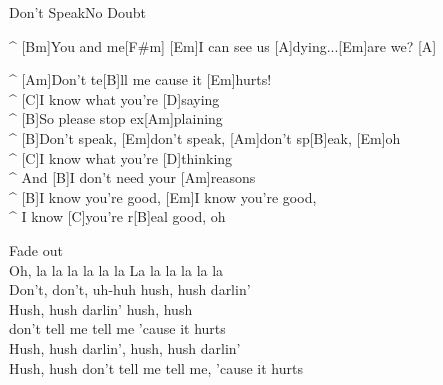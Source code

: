 \begin{song}{Don't Speak}{No Doubt}
\begin{guitar}
^ [Bm]You and me[F#m]      [Em]I can see us [A]dying...[Em]are we? [A]\\
\end{guitar}


\begin{guitar}
^ [Am]Don't te[B]ll me cause it [Em]hurts! \\
^ [C]I know what you're [D]saying\\
^ [B]So please stop ex[Am]plaining\\
^ [B]Don't speak, [Em]don't speak, [Am]don't sp[B]eak, [Em]oh\\
^ [C]I know what you're [D]thinking \\
^ And [B]I don't need your [Am]reasons \\
^ [B]I know you're good, [Em]I know you're good, \\
^ I know [C]you're r[B]eal good, oh \\
\end{guitar}

\begin{guitar}
Fade out\\
Oh, la la la la la la La la la la la la \\
Don't, don't, uh-huh hush, hush darlin' \\
Hush, hush darlin' hush, hush \\
don't tell me tell me 'cause it hurts \\
Hush, hush darlin', hush, hush darlin' \\
Hush, hush don't tell me tell me, 'cause it hurts\\
\end{guitar}
\end{song}
